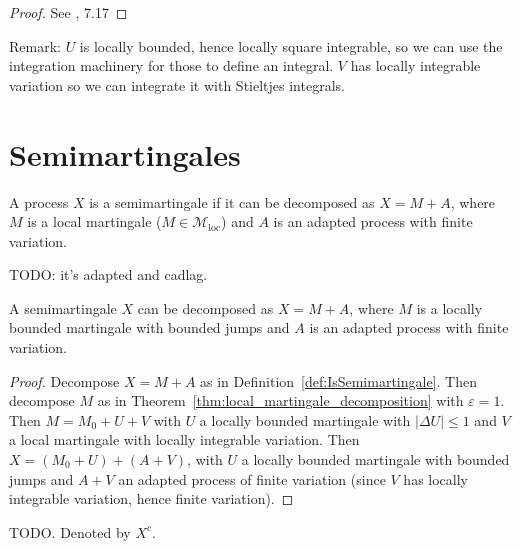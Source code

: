 \begin{proof}
See  \cite{he2019semimartingale}, 7.17
\end{proof}

Remark:
$U$ is locally bounded, hence locally square integrable, so we can use the integration machinery for those to define an integral.
$V$ has locally integrable variation so we can integrate it with Stieltjes integrals.


\section{Semimartingales}


\begin{definition}[Semimartingale]\label{def:IsSemimartingale}
A process $X$ is a semimartingale if it can be decomposed as $X = M + A$, where $M$ is a local martingale ($M \in \mathcal{M}_{\mathrm{loc}}$) and $A$ is an adapted process with finite variation.
\end{definition}

TODO: it's adapted and cadlag.


\begin{lemma}\label{lem:IsSemimartingale.decomposition}
A semimartingale $X$ can be decomposed as $X = M + A$, where $M$ is a locally bounded martingale with bounded jumps and $A$ is an adapted process with finite variation.
\end{lemma}

\begin{proof}
Decompose $X = M + A$ as in Definition~\ref{def:IsSemimartingale}.
Then decompose $M$ as in Theorem~\ref{thm:local_martingale_decomposition} with $\varepsilon = 1$.
Then $M = M_0 + U + V$ with $U$ a locally bounded martingale with $\vert \Delta U \vert \le 1$ and $V$ a local martingale with locally integrable variation.
Then $X = (M_0 + U) + (A + V)$, with $U$ a locally bounded martingale with bounded jumps and $A + V$ an adapted process of finite variation (since $V$ has locally integrable variation, hence finite variation).
\end{proof}


\begin{definition}\label{def:IsSemimartingale.continuousMartingalePart}
TODO. Denoted by $X^c$.
\end{definition}


